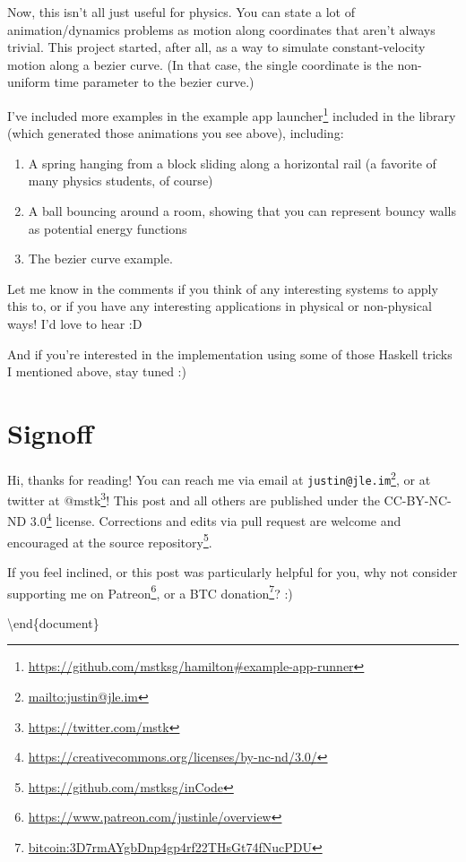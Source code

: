 \documentclass[]{article}
\renewcommand{\href}[2]{#2\footnote{\url{#1}}}
\begin{document}
Now, this isn't all just useful for physics. You can state a lot of
animation/dynamics problems as motion along coordinates that aren't always
trivial. This project started, after all, as a way to simulate constant-velocity
motion along a bezier curve. (In that case, the single coordinate is the
non-uniform time parameter to the bezier curve.)

I've included more examples in the
\href{https://github.com/mstksg/hamilton\#example-app-runner}{example app
launcher} included in the library (which generated those animations you see
above), including:

\begin{enumerate}
\def\labelenumi{\arabic{enumi}.}
\tightlist
\item
  A spring hanging from a block sliding along a horizontal rail (a favorite of
  many physics students, of course)
\item
  A ball bouncing around a room, showing that you can represent bouncy walls as
  potential energy functions
\item
  The bezier curve example.
\end{enumerate}

Let me know in the comments if you think of any interesting systems to apply
this to, or if you have any interesting applications in physical or non-physical
ways! I'd love to hear :D

And if you're interested in the implementation using some of those Haskell
tricks I mentioned above, stay tuned :)

\section{Signoff}\label{signoff}

Hi, thanks for reading! You can reach me via email at
\href{mailto:justin@jle.im}{\nolinkurl{justin@jle.im}}, or at twitter at
\href{https://twitter.com/mstk}{@mstk}! This post and all others are published
under the \href{https://creativecommons.org/licenses/by-nc-nd/3.0/}{CC-BY-NC-ND
3.0} license. Corrections and edits via pull request are welcome and encouraged
at \href{https://github.com/mstksg/inCode}{the source repository}.

If you feel inclined, or this post was particularly helpful for you, why not
consider \href{https://www.patreon.com/justinle/overview}{supporting me on
Patreon}, or a \href{bitcoin:3D7rmAYgbDnp4gp4rf22THsGt74fNucPDU}{BTC donation}?
:)

\textbackslash end\{document\}
\end{document}
